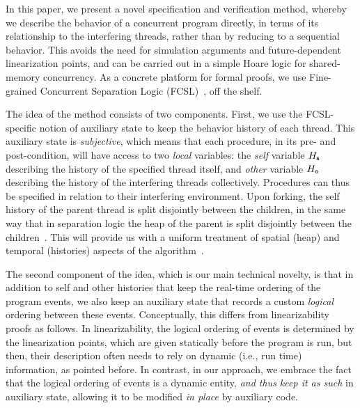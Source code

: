 \begin{comment}
\gad{Should we say here that previous/most approaches to reason with
  non-fixed linearization point do so with a dedicated
  meta-theory~\cite{QadeerST+tr09,LiangF+pldi13}?}

 \gad{Also, I don't like how the \code{readPair} fits here so far. We
   are ignoring the fact that you guys've already verified it in
   FCSL.}

\end{comment}
 
In this paper, we present a novel specification and verification
method, whereby we describe the behavior of a concurrent program
directly, in terms of its relationship to the interfering threads,
rather than by reducing to a sequential behavior. This avoids the need
for simulation arguments and future-dependent linearization points,
and can be carried out in a simple Hoare logic for shared-memory
concurrency. As a concrete platform for formal proofs, we use
Fine-grained Concurrent Separation Logic
(FCSL)~\cite{Sergey-al:PLDI15,Nanevski-al:ESOP14}, off the shelf.

The idea of the method consists of two components. First, we use the
FCSL-specific notion of auxiliary state to keep the behavior history
of each thread. This auxiliary state is \emph{subjective}, which means
that each procedure, in its pre- and post-condition, will have access
to two \emph{local} variables: the \emph{self} variable $H_{\mathsf{s}}$
describing the history of the specified thread itself, and
\emph{other} variable $H_{\mathsf{o}}$ describing the history of the
interfering threads collectively. Procedures can thus be specified in
relation to their interfering environment. 
%
%
Upon forking, the self history of the parent thread is split
disjointly between the children, in the same way that in separation
logic the heap of the parent is split disjointly between the
children~\cite{ohe+rey+yan:csl01, Reynolds02}. This will provide us
with a uniform treatment of spatial (heap) and temporal (histories)
aspects of the algorithm~\cite{Sergey-al:ESOP15}.

The second component of the idea, which is our main technical novelty,
is that in addition to self and other histories that keep the
real-time ordering of the program events, we also keep an auxiliary
state that records a custom \emph{logical} ordering between these
events. Conceptually, this differs from linearizability proofs as
follows. In linearizability, the logical ordering of events is
determined by the linearization points, which are given statically
before the program is run, but then, their description often needs to
rely on dynamic (i.e., run time) information, as pointed before. In
contrast, in our approach, we embrace the fact that the logical
ordering of events is a dynamic entity, \emph{and thus keep it as
  such} in auxiliary state, allowing it to be modified \emph{in place}
by auxiliary code.

